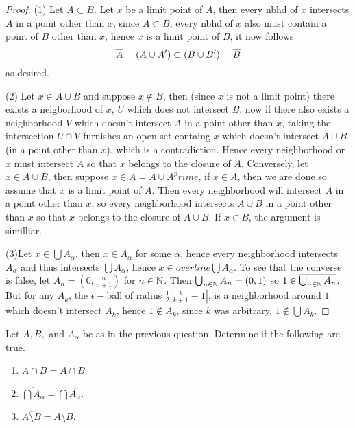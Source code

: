     \begin{proof}
        (1) Let $A \subset B$. Let $x$ be a limit point of $A$, then every nbhd of $x$ intersects $A$ in a point other than $x$, since $A \subset B$, every nbhd of $x$ also must contain a point of $B$ other than $x$, 
        hence $x$ is a limit point of $B$, it now follows 
        \[\cA = (A \cup A^\prime) \subset (B \cup B^\prime ) = \cB\]
        as desired. 

        (2) Let $x \in \overline{A \cup B}$ and suppose $x \notin \overline{B}$, then (since $x$ is not a limit point) there exists a neigborhood of $x$, $U$ which does not intersect $B$, now if there also exists a neighborhood $V$ which doesn't intersect $A$ in a point 
        other than $x$, taking the intersection $U \cap V$ furnishes an open set containg $x$ which doesn't intersect $A \cup B$ (in a point other than $x$), which is a contradiction. Hence every neighborhood or $x$ must intersect $A$ so that $x$ belongs to the 
        closure of $A$. Conversely,  let $x \in \overline{A} \cup \overline{B}$, then suppose $x \in \overline{A} = A \cup A^prime$, if $x \in A$, then we are done so assume that $x$ is a limit point of $A$. Then every neighborhood will intersect $A$ in a point other than $x$, so 
        every neighborhood intersects $A \cup B$ in a point other than $x$ so that $x$ belongs to the closure of $A \cup B$. If $x \in \overline{B}$, the argument is similliar. 

        (3)Let $x \in \bigcup \overline{A_\alpha}$, then $x \in \overline{A_\alpha}$ for some $\alpha$, hence every neighborhood intersects $A_\alpha$ and thus intersects $\bigcup A_\alpha$, hence $x \in overline{\bigcup A_\alpha}$. 
        To see that the converse is false, let $A_n = (0, \frac{n}{n+1})$ for $n \in \mathbb{N}$. Then $\bigcup_{n \in \mathbb{N}}A_n = (0, 1)$ so $1 \in \overline{\bigcup_{n \in \mathbb{N}} A_n}$. But for any $A_k$, the $\epsilon-$ball of radius $\frac{1}{2} |\frac{k}{k+1} -1|$, 
        is a neighborhood around $1$ which doesn't intersect $A_k$, hence $1 \notin \overline{A_k}$, since $k$ was arbitrary, $1 \notin \bigcup \overline{A_k}$.  

    \end{proof}


    \question 
    Let $A, B, $ and $A_\alpha$ be as in the previous question. Determine if the following are true. 

    \begin{enumerate}
        \item $\overline{A \cap B} = \overline{A} \cap \overline{B}$. 
        \item $\overline{\bigcap A_\alpha} = \bigcap \overline{A_\alpha}$. 
        \item $\overline{A \setminus B} = \overline{A} \setminus \overline{B}$. 
        
    \end{enumerate}

